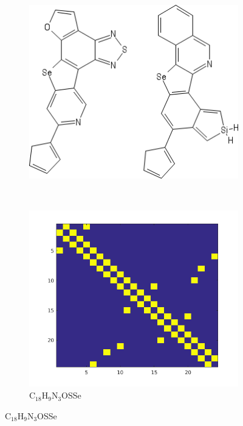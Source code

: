 \documentclass[a4paper]{article}
\begin{document}
\begin{figure}[h]
\caption{Two molecules with adjacency matrices in HCEP }
\label{fig:molecules}
\centering
\begin{subfigure}[h]{0.5\columnwidth}
	\includegraphics[width=\textwidth]{sketcher2}
\end{subfigure}\\
\begin{subfigure}[h]{0.3\columnwidth}
	\includegraphics[width=\textwidth]{adjacency1}
     \caption{C$_{18}$H$_9$N$_3$OSSe}
\end{subfigure}

\end{figure}
\end{document}
